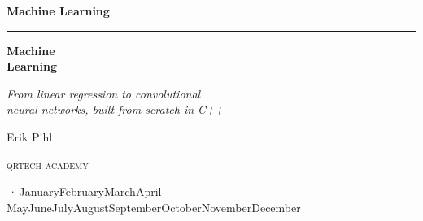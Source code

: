 %
\providecommand*{\bookversion}{}
\newcommand{\bookdate}{\number\day\space\ifcase\month\or January\or February\or March\or April\or
  May\or June\or July\or August\or September\or October\or November\or December\fi\space
  \number\year}
\newcommand{\bookedition}{\ifx\bookversion\empty\else\bookversion\,·\,\fi\bookdate}

\thispagestyle{empty}
\vspace*{2.2in}
\begin{flushright}
  {\Large\bfseries Machine Learning}
\end{flushright}
\cleardoublepage

\thispagestyle{empty}
\vspace*{1.1in}
\begin{flushleft}
  {\color{accent}\rule{0.9in}{2.5pt}}\par\vspace{1.4ex}
  {\fontsize{32}{38}\selectfont\bfseries Machine\\[0.15ex] Learning\par}
  \vspace{2.2ex}
  {\Large\itshape From linear regression to convolutional\\neural networks, built from scratch in
    C++\par}
  \vspace{1.2in}
  {\large Erik Pihl\par}
  \vfill
  {\small\scshape\lsstyle qrtech academy\par}
  \vspace{0.6ex}
  {\small\color{muted} \bookedition\par}
\end{flushleft}
\newpage

